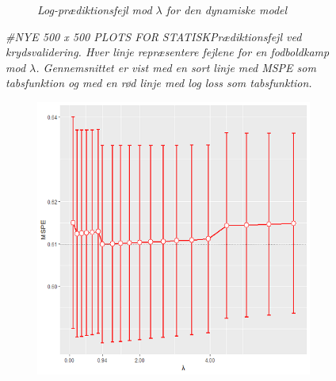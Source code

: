 \documentclass[11pt,a4paper]{article}
\begin{document}
\begin{figure}[h!]
\begin{subfigure}[b]{0.45\linewidth}
    \caption{\textit{Log-prædiktionsfejl mod $\lambda$ for den dynamiske model}}
    \label{fig:DynLogLossLine}  
    \end{subfigure}
\caption{\textit{#NYE 500 x 500 PLOTS FOR STATISKPrædiktionsfejl ved krydsvalidering. Hver linje repræsentere fejlene for en fodboldkamp mod $\lambda$. Gennemsnittet er vist med en sort linje med MSPE som tabsfunktion og med en rød linje med log loss som tabsfunktion.}}
  \label{fig:Prædiktionsfejl}
\end{figure}


\begin{figure}[h!]
  \centering
\begin{subfigure}[b]{0.45\textwidth}
\includegraphics[width=\textwidth]{MSPEBARPLOTSTATNY1.png}
    

\end{subfigure}
\end{figure}
\end{document}

